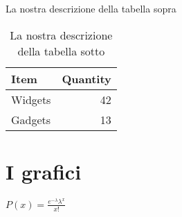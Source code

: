 \documentclass[]{article}
\begin{document}
    \begin{table}[h]
    \caption{La nostra descrizione della tabella sopra}
    \centering 
        \begin{tabular}{l|r} 
        Item & Quantity \\\hline %
        Widgets & 42 \\ %
        Gadgets & 13
        \end{tabular}
        \caption{La nostra descrizione della tabella sotto} %
    \end{table}

    \section{I grafici}
    $ P\left( x \right) = \frac{e^{-\lambda } \lambda^x }{{x!}} $
\end{document}

